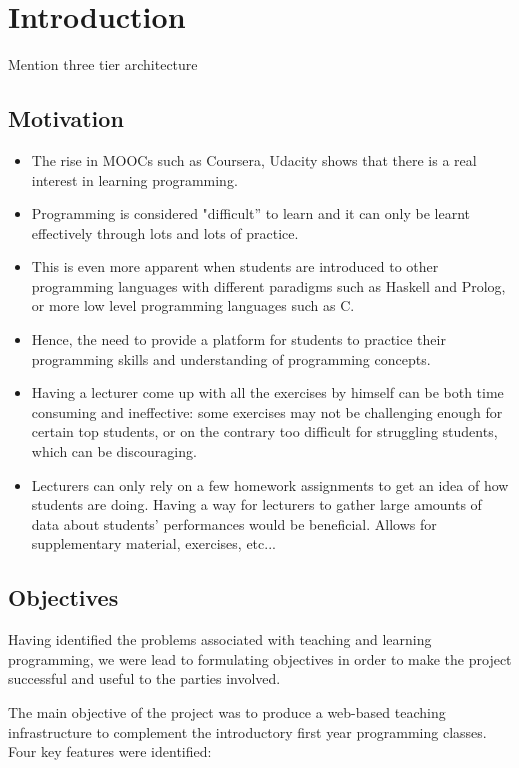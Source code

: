 \chapter{Introduction}
Mention three tier architecture

\section{Motivation}

\begin{itemize}
\item The rise in MOOCs such as Coursera, Udacity shows that there is a real interest in learning programming.
\item Programming is considered "difficult'' to learn and it can only be learnt effectively through lots and lots of practice.
\item This is even more apparent when students are introduced to other programming languages with different paradigms such as Haskell and Prolog, or more low level programming languages such as C.
\item Hence, the need to provide a platform for students to practice their programming skills and understanding of programming concepts.
\item Having a lecturer come up with all the exercises by himself can be both time consuming and ineffective: some exercises may not be challenging enough for certain top students, or on the contrary too difficult for struggling students, which can be discouraging.
\item Lecturers can only rely on a few homework assignments to get an idea of how students are doing. Having a way for lecturers to gather large amounts of data about students' performances would be beneficial. Allows for supplementary material, exercises, etc...
\end{itemize}

\section{Objectives}
Having identified the problems associated with teaching and learning programming, we were lead to formulating objectives in order to make the project successful and useful to the parties involved. \newline

The main objective of the project was to produce a web-based teaching infrastructure to complement the introductory first year programming classes. Four key features were identified:

